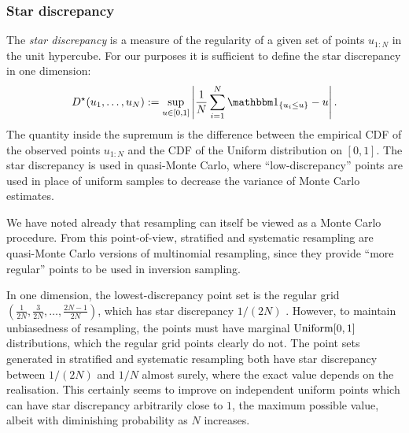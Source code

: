 \subsubsection{Star discrepancy \seb{$\checkmark$} }
%

The \emph{star discrepancy}\seb{[citation]} is a measure of the regularity of a given set of points $u_{1:N}$ in the unit hypercube. For our purposes it is sufficient to define the star discrepancy in one dimension:
\begin{equation}
D^\star (u_1, \dots, u_N) := \sup_{u \in [0,1]} \left| \frac{1}{N} \sum_{i=1}^N \I{u_i \leq u} -u \right| .
\end{equation}
The quantity inside the supremum is the difference between the empirical CDF of the observed points $u_{1:N}$ and the CDF of the Uniform distribution on $[0,1]$.
The star discrepancy is used in quasi-Monte Carlo, where ``low-discrepancy'' points are used in place of uniform samples to decrease the variance of Monte Carlo estimates.

We have noted already  that resampling can itself be viewed as a Monte Carlo procedure.
From this point-of-view, stratified and systematic resampling are quasi-Monte Carlo versions of multinomial resampling, since they provide ``more regular'' points to be used in inversion sampling.

In one dimension, the lowest-discrepancy point set is the regular grid $( \frac{1}{2N}, \frac{3}{2N}, \dots, \frac{2N-1}{2N} )$, which has star discrepancy $1/(2N)$ \seb{[citation]}.
However, to maintain unbiasedness of resampling, the points must have marginal $\operatorname{Uniform}[0,1]$ distributions, which the regular grid points clearly do not.
The point sets generated in stratified and systematic resampling both have star discrepancy between $1/(2N)$ and $1/N$ almost surely, where the exact value depends on the realisation.
This certainly seems to improve on independent uniform points which can have star discrepancy arbitrarily close to $1$, the maximum possible value, albeit with diminishing probability as $N$ increases.



